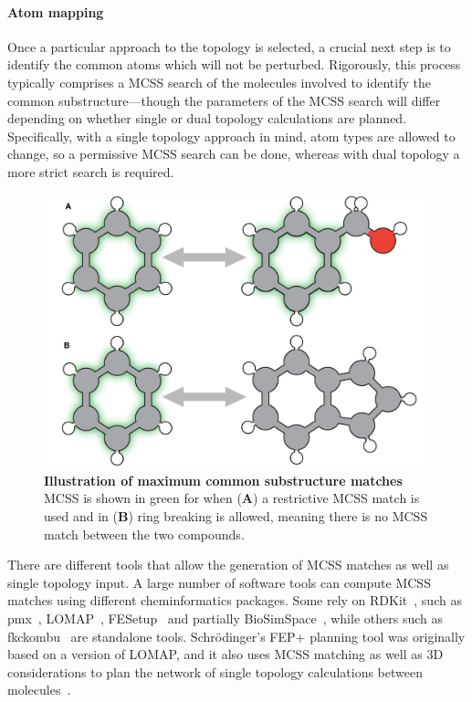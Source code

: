 \documentclass[9pt,bestpractices,pubversion]{livecoms}
\begin{document}
\paragraph{Atom mapping}
Once a particular approach to the topology is selected, a crucial next step is to identify the common atoms which will not be perturbed.
Rigorously, this process typically comprises a MCSS search of the molecules involved to identify the common substructure---though the parameters of the MCSS search will differ depending on whether single or dual topology calculations are planned.
Specifically, with a single topology approach in mind, atom types are allowed to change, so a permissive MCSS search can be done, whereas with dual topology a more strict search is required.
\begin{figure}
    \includegraphics[width=0.95\linewidth]{figures/fig4_mcs/Figure.pdf}
    \caption{\textbf{Illustration of maximum common substructure matches} MCSS is shown in green for when (\textbf{A}) a restrictive MCSS match is used and in (\textbf{B}) ring breaking is allowed, meaning there is no MCSS match between the two compounds.}
    \label{fig:fig_mcss}
\end{figure} 

There are different tools that allow the generation of MCSS matches as well as single topology input. A large number of software tools can compute MCSS matches using different cheminformatics packages. Some rely on RDKit~\cite{rdkit2019Dec}, such as pmx~\cite{gapsys2015pmx}, LOMAP~\cite{liu2013lead}, FESetup~\cite{loeffler2015fesetup} and partially BioSimSpace~\cite{hedges2019biosimspace}, while others such as fkckombu~\cite{kawabata20143d} are standalone tools. Schr\"{o}dinger's FEP+ planning tool was originally based on a version of LOMAP, and it also uses MCSS matching as well as 3D considerations to plan the network of single topology calculations between molecules~\cite{wang2015accurate}. 
\end{document}
